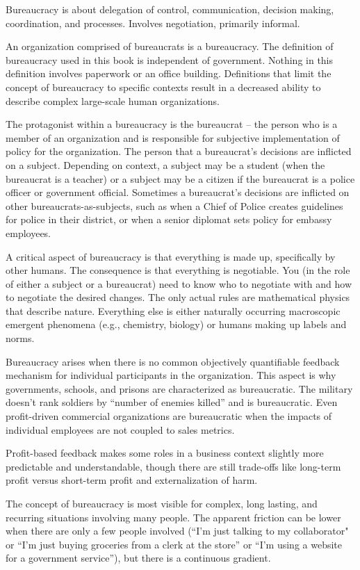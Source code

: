 Bureaucracy is about delegation of control, communication, decision making, coordination, and processes. Involves negotiation, primarily informal. 

An organization comprised of bureaucrats is a \gls{bureaucracy}. The definition of bureaucracy used in this book is independent of government. Nothing in this definition involves paperwork or an office building. Definitions that limit the concept of bureaucracy to specific contexts result in a decreased ability to describe complex large-scale human organizations. 

The protagonist within a \gls{bureaucracy} is the \gls{bureaucrat} -- the person who is a member of an organization and is responsible for subjective implementation of policy for the organization. The person that a bureaucrat's decisions are inflicted on a \gls{subject}.  Depending on context, a subject may be a student (when the bureaucrat is a teacher) or a subject may be a citizen if the bureaucrat is a police officer or government official. Sometimes a bureaucrat's decisions are inflicted on other bureaucrats-as-subjects, such as when a Chief of Police creates guidelines for police in their district, or when a senior diplomat sets policy for embassy employees. 

A critical aspect of bureaucracy is that everything is made up, specifically by other humans. The consequence is that everything is negotiable. You (in the role of either a subject or a bureaucrat) need to know who to negotiate with and how to negotiate the desired changes. The only actual rules are mathematical physics that describe nature. Everything else is either naturally occurring macroscopic emergent phenomena (e.g., chemistry, biology) or humans making up labels and norms. 

Bureaucracy arises when there is no common objectively quantifiable feedback mechanism for individual participants in the organization. This aspect is why governments, schools, and prisons are characterized as bureaucratic. The military doesn't rank soldiers by ``number of enemies killed'' and is bureaucratic. Even profit-driven commercial organizations are bureaucratic when the impacts of individual employees are not coupled to sales metrics. 

Profit-based feedback makes some roles in a business context slightly more predictable and understandable, though there are still trade-offs like long-term profit versus short-term profit and externalization of harm. 

The concept of bureaucracy is most visible for complex, long lasting, and recurring situations involving many people. The apparent friction can be lower when there are only a few people involved (``I'm just talking to my collaborator" or ``I'm just buying groceries from a clerk at the store'' or ``I'm using a website for a government service''), but there is a continuous gradient. 

